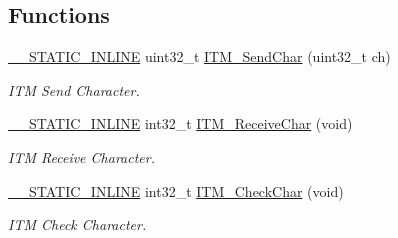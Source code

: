 \subsection*{Functions}
\begin{DoxyCompactItemize}
\item 
\hyperlink{cmsis__iccarm_8h_aba87361bfad2ae52cfe2f40c1a1dbf9c}{\+\_\+\+\_\+\+S\+T\+A\+T\+I\+C\+\_\+\+I\+N\+L\+I\+NE} uint32\+\_\+t \hyperlink{group___c_m_s_i_s__core___debug_functions_gac90a497bd64286b84552c2c553d3419e}{I\+T\+M\+\_\+\+Send\+Char} (uint32\+\_\+t ch)
\begin{DoxyCompactList}\small\item\em I\+TM Send Character. \end{DoxyCompactList}\item 
\hyperlink{cmsis__iccarm_8h_aba87361bfad2ae52cfe2f40c1a1dbf9c}{\+\_\+\+\_\+\+S\+T\+A\+T\+I\+C\+\_\+\+I\+N\+L\+I\+NE} int32\+\_\+t \hyperlink{group___c_m_s_i_s__core___debug_functions_gac3ee2c30a1ac4ed34c8a866a17decd53}{I\+T\+M\+\_\+\+Receive\+Char} (void)
\begin{DoxyCompactList}\small\item\em I\+TM Receive Character. \end{DoxyCompactList}\item 
\hyperlink{cmsis__iccarm_8h_aba87361bfad2ae52cfe2f40c1a1dbf9c}{\+\_\+\+\_\+\+S\+T\+A\+T\+I\+C\+\_\+\+I\+N\+L\+I\+NE} int32\+\_\+t \hyperlink{group___c_m_s_i_s__core___debug_functions_gae61ce9ca5917735325cd93b0fb21dd29}{I\+T\+M\+\_\+\+Check\+Char} (void)
\begin{DoxyCompactList}\small\item\em I\+TM Check Character. \end{DoxyCompactList}\end{DoxyCompactItemize}
